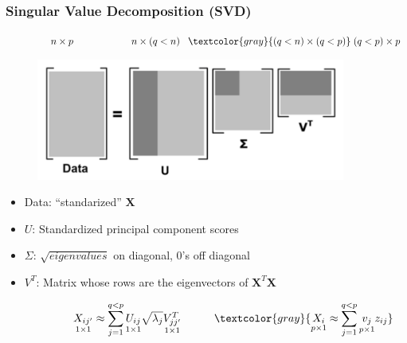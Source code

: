 \documentclass[xcolor={dvipsnames}]{beamer}
\begin{document}
\frame
{
 \frametitle{Singular Value Decomposition (SVD)}

\footnotesize
$\quad\quad\quad\quad n \times p \quad\quad\quad\quad\quad\quad n \times (q<n) \;\;\; \textcolor{gray}{(q<n) \times (q<p)} \;  (q<p) \times p$
\vspace{-.75em}
\normalsize
\begin{figure}
\includegraphics[width=4in]{stuff/svd.png} 
\end{figure}

\begin{itemize}
\item Data: ``standarized'' ${\boldsymbol X}$
\item $U$: Standardized principal component scores
\item $\Sigma$: $\sqrt{eigenvalues}$ on diagonal, 0's off diagonal 
\item $V^T$: Matrix whose rows are the eigenvectors of ${\boldsymbol X}^T{\boldsymbol X}$
\end{itemize}

$$\quad\quad\quad \quad\quad  \underset{1\times 1}{X_{ij'}} \approx \sum_{j=1}^{q<p} \underset{1\times 1}{U_{ij}} \sqrt{\lambda_j} \underset{1\times 1}{V_{jj'}^T} \quad\quad\quad  \textcolor{gray}{\underset{p\times1}{X_{i}} \approx \sum_{j=1}^{q<p} \underset{p\times1}{v_{j}} z_{ij}} $$

}
\end{document}
